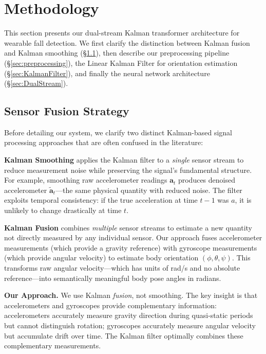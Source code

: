 \section{Methodology}
\label{sec:Meth}

This section presents our dual-stream Kalman transformer architecture for wearable fall detection. We first clarify the distinction between Kalman fusion and Kalman smoothing (\S\ref{sec:fusion_strategy}), then describe our preprocessing pipeline (\S\ref{sec:preprocessing}), the Linear Kalman Filter for orientation estimation (\S\ref{sec:KalmanFilter}), and finally the neural network architecture (\S\ref{sec:DualStream}).

\subsection{Sensor Fusion Strategy}
\label{sec:fusion_strategy}

Before detailing our system, we clarify two distinct Kalman-based signal processing approaches that are often confused in the literature:

\textbf{Kalman Smoothing} applies the Kalman filter to a \textit{single} sensor stream to reduce measurement noise while preserving the signal's fundamental structure. For example, smoothing raw accelerometer readings $\mathbf{a}_t$ produces denoised accelerometer $\tilde{\mathbf{a}}_t$---the same physical quantity with reduced noise. The filter exploits temporal consistency: if the true acceleration at time $t-1$ was $a$, it is unlikely to change drastically at time $t$.

\textbf{Kalman Fusion} combines \textit{multiple} sensor streams to estimate a new quantity not directly measured by any individual sensor. Our approach fuses accelerometer measurements (which provide a gravity reference) with gyroscope measurements (which provide angular velocity) to estimate body orientation $(\phi, \theta, \psi)$. This transforms raw angular velocity---which has units of rad/s and no absolute reference---into semantically meaningful body pose angles in radians.

\textbf{Our Approach.} We use Kalman \textit{fusion}, not smoothing. The key insight is that accelerometers and gyroscopes provide complementary information: accelerometers accurately measure gravity direction during quasi-static periods but cannot distinguish rotation; gyroscopes accurately measure angular velocity but accumulate drift over time. The Kalman filter optimally combines these complementary measurements.

